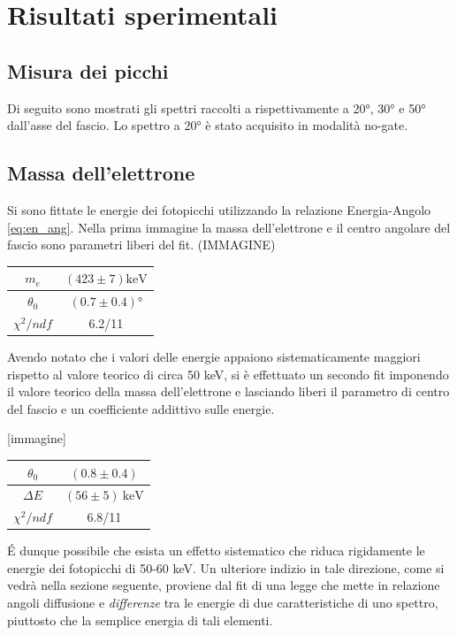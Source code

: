 \documentclass[8pt]{extarticle}
\begin{document}
\section{Risultati sperimentali}
\subsection{Misura dei picchi} \label{subsec:picchi}
Di seguito sono mostrati gli spettri raccolti a rispettivamente a 20°, 30° e 50° dall'asse del fascio. Lo spettro a 20° è stato acquisito in modalità no-gate.

\subsection{Massa dell'elettrone}
Si sono fittate le energie dei fotopicchi utilizzando la relazione Energia-Angolo \ref{eq:en_ang}.
Nella prima immagine la massa dell'elettrone e il centro angolare del fascio sono parametri liberi del fit. 
(IMMAGINE)
\begin{center}
\begin{tabular}{|c|c|}
\hline 
$m_e$ & $(423\pm 7) \mathrm{keV}$ \\ 
\hline 
$\theta_0$ & $(0.7\pm 0.4)°$ \\ 
\hline 
$\chi^2 / ndf$ & 6.2/11 \\ 
\hline 
\end{tabular} 
\end{center}

Avendo notato che i valori delle energie appaiono sistematicamente maggiori rispetto al valore teorico di circa 50 keV, si è effettuato un secondo fit imponendo il valore teorico della massa dell'elettrone e lasciando liberi il parametro di centro del fascio e un coefficiente addittivo sulle energie.

[immagine]

\begin{center}
\begin{tabular}{|c|c|}
\hline 
$\theta_0$ & $(0.8\pm 0.4)$ \\ 
\hline 
$\Delta E$ & $(56\pm 5)\ \mathrm{keV}$ \\ 
\hline 
$\chi^2 / ndf$ & 6.8/11 \\ 
\hline 
\end{tabular} 
\end{center}

\'E dunque possibile che esista un effetto sistematico che riduca rigidamente le energie dei fotopicchi di 50-60 keV. Un ulteriore indizio in tale direzione, come si vedrà nella sezione seguente, proviene dal fit di una legge che mette in relazione angoli diffusione e \textit{differenze} tra le energie di due caratteristiche di uno spettro, piuttosto che la semplice energia di tali elementi.
\end{document}

